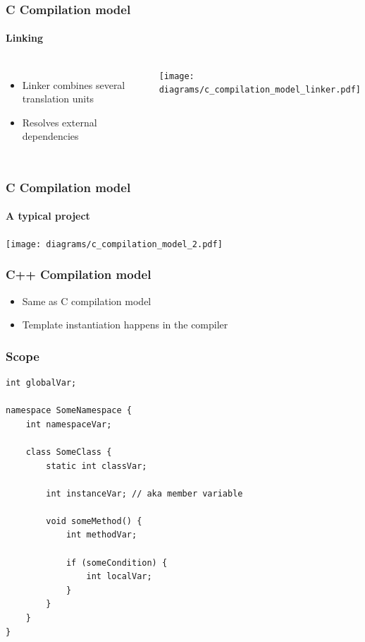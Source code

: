 \documentclass[table]{beamer}
\newcommand{\declarelesson}{\textbf{\color{themegreen}{Lesson:}} }
\begin{document}
\begin{frame}
    \frametitle{\declarelesson C Compilation model}
    \framesubtitle{Linking}
    \begin{columns}[t]
        \column{4cm}
        \begin{itemize}
            \item Linker combines several translation units
            \item Resolves external dependencies
        \end{itemize}
        \column[T]{8cm}
        \texttt{[image: diagrams/c\_compilation\_model\_linker.pdf]}
    \end{columns}
\end{frame}

\begin{frame}
    \frametitle{\declarelesson C Compilation model}
    \framesubtitle{A typical project}
    \texttt{[image: diagrams/c\_compilation\_model\_2.pdf]}
\end{frame}

\begin{frame}
    \frametitle{\declarelesson C++ Compilation model}
    \begin{itemize}
        \item Same as C compilation model
        \item Template instantiation happens in the compiler
    \end{itemize}
\end{frame}


\begin{frame}[fragile]
    \frametitle{\declarelesson Scope}
    \begin{lstlisting}[basicstyle=\scriptsize\ttfamily\color{codefg}]
int globalVar;

namespace SomeNamespace {
    int namespaceVar;

    class SomeClass {
        static int classVar;

        int instanceVar; // aka member variable

        void someMethod() {
            int methodVar;

            if (someCondition) {
                int localVar;
            }
        }
    }
}
    \end{lstlisting}
\end{frame}
\end{document}
